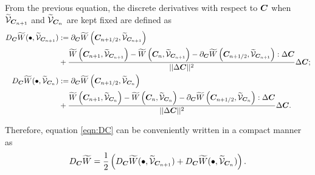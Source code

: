From the previous equation, the discrete derivatives with respect to $\boldsymbol{C}$ when $\widetilde{\mathcal{V}}_{\boldsymbol{C}_{n+1}}$ and $\widetilde{\mathcal{V}}_{\boldsymbol{C}_{n}}$ are kept fixed are defined as
%
\begin{equation}\label{eqn:DC1}
\begin{aligned}
D_{\vect{C}}\widetilde{W}(\bullet,\widetilde{\mathcal{V}}_{\vect{C}_{n+1}})&: =  \partial_{\vect{C}}\widetilde{W}\left(\vect{C}_{n+1/2},\widetilde{\mathcal{V}}_{\vect{C}_{n+1}}\right) \\
%
&+\frac{\widetilde{W}\left(\vect{C}_{n+1},\widetilde{\mathcal{V}}_{\vect{C}_{n+1}}\right) - \widetilde{W}\left(\vect{C}_{n},\widetilde{\mathcal{V}}_{\vect{C}_{n+1}}\right)-\partial_{\vect{C}}\widetilde{W}\left(\vect{C}_{n+1/2},\widetilde{\mathcal{V}}_{\vect{C}_{n+1}}\right):\Delta\vect{C}}{\vert\vert\Delta\vect{C}\vert\vert^2}\Delta\vect{C};\\
%
%
D_{\vect{C}}\widetilde{W}(\bullet,\widetilde{\mathcal{V}}_{\vect{C}_{n}})&: =   
\partial_{\vect{C}}\widetilde{W}\left(\vect{C}_{n+1/2},\widetilde{\mathcal{V}}_{\vect{C}_{n}}\right)\\
%
&+\frac{\widetilde{W}\left(\vect{C}_{n+1},\widetilde{\mathcal{V}}_{\vect{C}_{n}}\right) - \widetilde{W}\left(\vect{C}_{n},\widetilde{\mathcal{V}}_{\vect{C}_{n}}\right)-\partial_{\vect{C}}\widetilde{W}\left(\vect{C}_{n+1/2},\widetilde{\mathcal{V}}_{\vect{C}_{n}}\right):\Delta\vect{C}}{\vert\vert\Delta\vect{C}\vert\vert^2}\Delta\vect{C}.
%
%
%
\end{aligned}
\end{equation}
%

Therefore, equation \eqref{eqn:DC} can be conveniently written in a compact manner as
%
\begin{equation}
D_{\boldsymbol{C}}\widetilde{W}=\frac{1}{2}\left(D_{\boldsymbol{C}}\widetilde{W}(\bullet,\widetilde{\mathcal{V}}_{\boldsymbol{C}_{n+1}}) + D_{\boldsymbol{C}}\widetilde{W}(\bullet,\widetilde{\mathcal{V}}_{\boldsymbol{C}_n})\right).
\end{equation}


